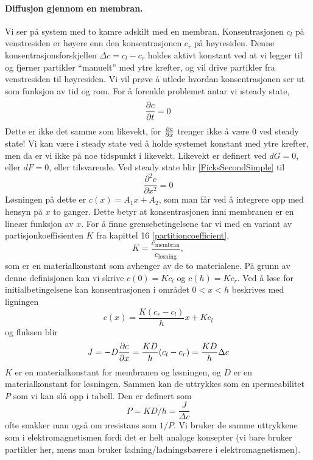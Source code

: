 \paragraph{Diffusjon gjennom en membran.} Vi ser på system med to kamre adskilt med en membran. Konsentrasjonen $c_l$ på venstresiden er høyere enn den konsentrasjonen $c_r$ på høyresiden. Denne konsentrasjonsforskjellen $\Delta c = c_l - c_r$ holdes aktivt konstant ved at vi legger til og fjerner partikler ``manuelt'' med ytre krefter, og vil drive partikler fra venstresiden til høyresiden. Vi vil prøve å utlede hvordan konsentrasjonen ser ut som funksjon av tid og rom. For å forenkle problemet antar vi \i{steady state},
\begin{equation}
	\frac{\partial c}{\partial t}=0
\end{equation}
Dette er ikke det samme som likevekt, for $\frac{\partial c}{\partial x}$ trenger ikke å være $0$ ved steady state! Vi kan være i steady state ved å holde systemet konstant med ytre krefter, men da er vi ikke på noe tidspunkt i likevekt. Likevekt er definert ved $dG=0$, eller $dF=0$, eller tilsvarende. Ved steady state blir \eqref{FicksSecondSimple} til 
\begin{equation}
	\frac{\partial^2 c}{\partial x^2} = 0
\end{equation}
Løsningen på dette er $c(x)=A_1x+A_2$, som man får ved å integrere opp med hensyn på $x$ to ganger. Dette betyr at konsentrasjonen inni membranen er en lineær funksjon av $x$. For å finne grensebetingelsene tar vi med en variant av partisjonkoeffisienten $K$ fra kapittel 16 \eqref{partitioncoefficient},
\begin{equation}
	K=\frac{c_{\text{membran}}}{c_{\text{løsning}}},
\end{equation}
som er en materialkonstant som avhenger av de to materialene. På grunn av denne definisjonen kan vi skrive $c(0)=Kc_l$ og $c(h)=Kc_r$. Ved å løse for initialbetingelsene kan konsentrasjonen i området $0<x<h$ beskrives med ligningen
\begin{equation}
	c(x)=\frac{K(c_r-c_l)}{h}x+Kc_l
\end{equation}
og fluksen blir 
\begin{equation}
	J=-D\frac{\partial c}{\partial x}=\frac{KD}{h}(c_l-c_r)=\frac{KD}{h}\Delta c
\end{equation}
$K$ er en materialkonstant for membranen og løsningen, og $D$ er en materialkonstant for løsningen. Sammen kan de uttrykkes som en \i{permeabilitet} $P$ som vi kan slå opp i tabell. Den er definert som
\begin{equation}
	P=KD/h=\frac{J}{\Delta c}
\end{equation}
ofte snakker man også om \i{resistans} som $1/P$. Vi bruker de samme uttrykkene som i elektromagnetismen fordi det er helt analoge konsepter (vi bare bruker partikler her, mens man bruker ladning/ladningsbærere i elektromagnetismen).


